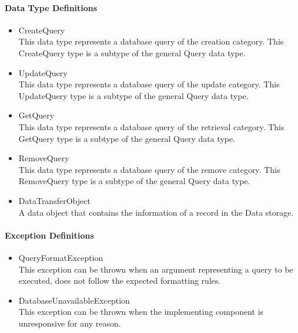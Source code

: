 \paragraph{Data Type Definitions}
\begin{itemize}
	\item CreateQuery\\
	This data type represents a database query of the creation category.
	This CreateQuery type is a subtype of the general Query data type. 
	\item UpdateQuery\\
	This data type represents a database query of the update category.
	This UpdateQuery type is a subtype of the general Query data type. 
	\item GetQuery\\
	This data type represents a database query of the retrieval category.
	This GetQuery type is a subtype of the general Query data type. 
	\item RemoveQuery\\
	This data type represents a database query of the remove category.
	This RemoveQuery type is a subtype of the general Query data type.
	\item DataTransferObject\\
	A data object that contains the information of a record in the Data storage.
\end{itemize}
\paragraph{Exception Definitions}
\begin{itemize}
	\item QueryFormatException\\
	This exception can be thrown when an argument representing a query to be executed, does not follow the expected formatting rules.
	\item DatabaseUnavailableException\\
	This exception can be thrown when the implementing component is unresponsive for any reason.
\end{itemize}
